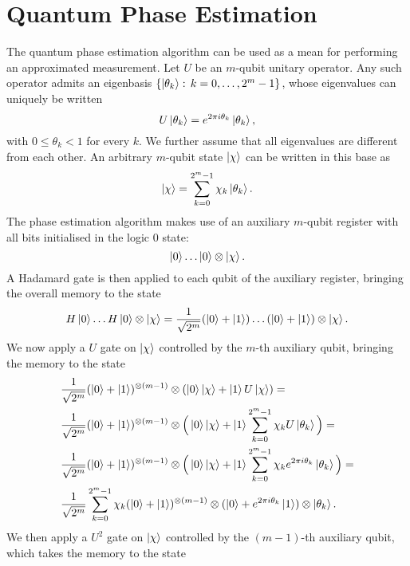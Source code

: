 \documentclass[a4paper,10pt]{report}
\begin{document}
\section{Quantum Phase Estimation}
The quantum phase estimation algorithm can be used as a mean for performing an approximated measurement.
Let $U$ be an $m$-qubit unitary operator. Any such operator admits an eigenbasis $\{\ket{\theta_k}:\,k=0,\dots,2^m-1\}$, whose eigenvalues can uniquely be written
\begin{equation}
U\ket{\theta_k} = e^{2\pi i\theta_k}\ket{\theta_k},
\end{equation}
with $0\le\theta_k<1$ for every $k$. We further assume that all eigenvalues are different from each other. An arbitrary $m$-qubit state $\ket{\chi}$ can be written in this base as
\begin{equation}
\ket{\chi} = \sum_{k=0}^{2^m-1}\chi_k\ket{\theta_k}.
\end{equation}
The phase estimation algorithm makes use of an auxiliary $m$-qubit register with all bits initialised in the logic 0 state:
\begin{equation}
\ket{0}\dots\ket{0}\otimes\ket{\chi}.
\end{equation}
A Hadamard gate is then applied to each qubit of the auxiliary register, bringing the overall memory to the state
\begin{equation}
H\ket{0}\dots H\ket{0}\otimes\ket{\chi} = \frac{1}{\sqrt{2^m}}(\ket{0}+\ket{1})\dots(\ket{0}+\ket{1})\otimes\ket{\chi}.
\end{equation}
We now apply a $U$ gate on $\ket{\chi}$ controlled by the $m$-th auxiliary qubit, bringing the memory to the state
\begin{align}
&\frac{1}{\sqrt{2^m}}(\ket{0}+\ket{1})^{\otimes(m-1)}\otimes(\ket{0}\ket{\chi} + \ket{1}U\ket{\chi}) = \nonumber\\
&\frac{1}{\sqrt{2^m}}(\ket{0}+\ket{1})^{\otimes(m-1)}\otimes\Big(\ket{0}\ket{\chi} + \ket{1}\sum_{k=0}^{2^m-1}\chi_kU\ket{\theta_k}\Big) = \nonumber\\
&\frac{1}{\sqrt{2^m}}(\ket{0}+\ket{1})^{\otimes(m-1)}\otimes\Big(\ket{0}\ket{\chi} + \ket{1}\sum_{k=0}^{2^m-1}\chi_k e^{2\pi i\theta_k}\ket{\theta_k}\Big) = \nonumber\\
&\frac{1}{\sqrt{2^m}}\sum_{k=0}^{2^m-1}\chi_k(\ket{0}+\ket{1})^{\otimes(m-1)}\otimes(\ket{0} + e^{2\pi i\theta_k}\ket{1})\otimes\ket{\theta_k}.
\label{eq:phase_estim}
\end{align}
We then apply a $U^2$ gate on $\ket{\chi}$ controlled by the $(m-1)$-th auxiliary qubit, which takes the memory to the state
\end{document}
